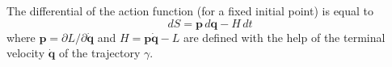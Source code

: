 The differential of the action function (for a fixed initial point) is equal to
$$dS = \mathbf{p} \, d\mathbf{q} - H \, dt$$
where $\mathbf{p} = \partial L / \partial \dot{\mathbf{q}}$ and $H = \mathbf{p} \dot{\mathbf{q}} - L$ are defined with the help of the terminal velocity $\dot{\mathbf{q}}$ of the trajectory $\gamma$.

